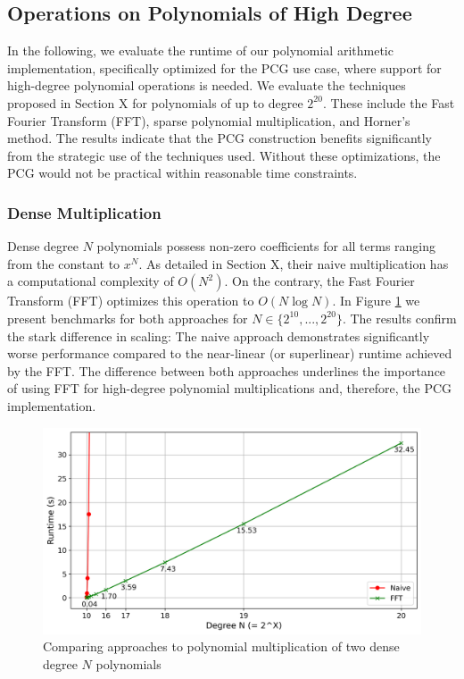 \subsection{Operations on Polynomials of High Degree}
In the following, we evaluate the runtime of our polynomial arithmetic implementation, specifically optimized for the PCG use case, where support for high-degree polynomial operations is needed. We evaluate the techniques proposed in Section \todo X for polynomials of up to degree $2^{20}$. These include the Fast Fourier Transform (FFT), sparse polynomial multiplication, and Horner's method. The results indicate that the PCG construction benefits significantly from the strategic use of the techniques used. Without these optimizations, the PCG would not be practical within reasonable time constraints.

\subsubsection{Dense Multiplication}
Dense degree $N$ polynomials possess non-zero coefficients for all terms ranging from the constant to $x^N$. As detailed in Section \todo X, their naive multiplication has a computational complexity of $O(N^2)$. On the contrary, the Fast Fourier Transform (FFT) optimizes this operation to $O(N \log N)$. In Figure \ref{fig:polyMultNaiveVsFFT} we present benchmarks for both approaches for $N\in \{2^{10}, ..., 2^{20}\}$. The results confirm the stark difference in scaling: The naive approach demonstrates significantly worse performance compared to the near-linear (or superlinear) runtime achieved by the FFT. The difference between both approaches underlines the importance of using FFT for high-degree polynomial multiplications and, therefore, the PCG implementation.

\begin{figure}[t]
    \centering
    \includegraphics[scale=0.49]{images/plots/poly_mult.png}
    \caption{Comparing approaches to polynomial multiplication of two dense degree $N$ polynomials}
    \label{fig:polyMultNaiveVsFFT}
\end{figure}

